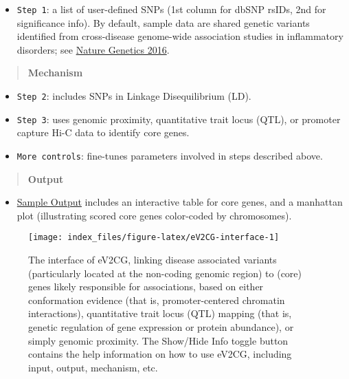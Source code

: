 \documentclass[
  oneside]{book}
\providecommand{\tightlist}{%
  \setlength{\itemsep}{0pt}\setlength{\parskip}{0pt}}
\begin{document}
\begin{itemize}
\tightlist
\item
  \texttt{Step\ 1}: a list of user-defined SNPs (1st column for dbSNP rsIDs, 2nd for significance info). By default, sample data are shared genetic variants identified from cross-disease genome-wide association studies in inflammatory disorders; see \href{https://www.ncbi.nlm.nih.gov/pubmed/26974007}{Nature Genetics 2016}.
\end{itemize}

\begin{quote}
\textbf{Mechanism}
\end{quote}

\begin{itemize}
\item
  \texttt{Step\ 2}: includes SNPs in Linkage Disequilibrium (LD).
\item
  \texttt{Step\ 3}: uses genomic proximity, quantitative trait locus (QTL), or promoter capture Hi-C data to identify core genes.
\item
  \texttt{More\ controls}: fine-tunes parameters involved in steps described above.
\end{itemize}

\begin{quote}
\textbf{Output}
\end{quote}

\begin{itemize}
\tightlist
\item
  \href{http://www.genetictargets.com/app/examples/_tmp_RMD_eV2CG.html}{Sample Output} includes an interactive table for core genes, and a manhattan plot (illustrating scored core genes color-coded by chromosomes).
\end{itemize}

\begin{figure}

{\centering \texttt{[image: index\_files/figure-latex/eV2CG-interface-1]} 

}

\caption{The interface of eV2CG, linking disease associated variants (particularly located at the non-coding genomic region) to (core) genes likely responsible for associations, based on either conformation evidence (that is, promoter-centered chromatin interactions), quantitative trait locus (QTL) mapping (that is, genetic regulation of gene expression or protein abundance), or simply genomic proximity. The Show/Hide Info toggle button contains the help information on how to use eV2CG, including input, output, mechanism, etc.}\label{fig:eV2CG-interface}
\end{figure}
\end{document}
